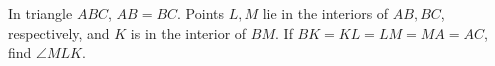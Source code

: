 In triangle $ABC$, $AB=BC$. Points $L,M$ lie in the interiors of $AB,BC$, respectively, and $K$ is in the interior of $BM$. If $BK=KL=LM=MA=AC$, find $\angle MLK$.
